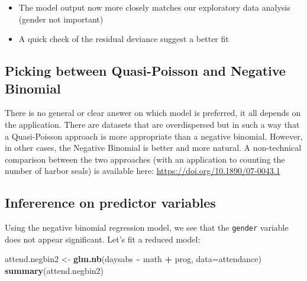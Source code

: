 \documentclass[
]{book}
\newenvironment{Shaded}{\begin{snugshade}}{\end{snugshade}}
\newcommand{\AttributeTok}[1]{\textcolor[rgb]{0.13,0.29,0.53}{#1}}
\newcommand{\FunctionTok}[1]{\textcolor[rgb]{0.13,0.29,0.53}{\textbf{#1}}}
\newcommand{\NormalTok}[1]{#1}
\newcommand{\OtherTok}[1]{\textcolor[rgb]{0.56,0.35,0.01}{#1}}
\newcommand{\SpecialCharTok}[1]{\textcolor[rgb]{0.81,0.36,0.00}{\textbf{#1}}}
\providecommand{\tightlist}{%
  \setlength{\itemsep}{0pt}\setlength{\parskip}{0pt}}
\begin{document}
\begin{itemize}
\tightlist
\item
  The model output now more closely matches our exploratory data analysis (gender not important)
\item
  A quick check of the residual deviance suggest a better fit
\end{itemize}

\hypertarget{picking-between-quasi-poisson-and-negative-binomial}{%
\subsection{Picking between Quasi-Poisson and Negative Binomial}\label{picking-between-quasi-poisson-and-negative-binomial}}

There is no general or clear answer on which model is preferred, it all depends on the application. There are datasets that are overdispersed but in such a way that a Quasi-Poisson approach is more appropriate than a negative binomial. However, in other cases, the Negative Binomial is better and more natural. A non-technical comparison between the two approaches (with an application to counting the number of harbor seals) is available here: \url{https://doi.org/10.1890/07-0043.1}

\hypertarget{infererence-on-predictor-variables}{%
\subsection{Infererence on predictor variables}\label{infererence-on-predictor-variables}}

Using the negative binomial regression model, we see that the \texttt{gender} variable does not appear significant. Let's fit a reduced model:

\begin{Shaded}
\begin{Highlighting}[]
\NormalTok{attend.negbin2 }\OtherTok{\textless{}{-}} \FunctionTok{glm.nb}\NormalTok{(daysabs }\SpecialCharTok{\textasciitilde{}}\NormalTok{ math }\SpecialCharTok{+}\NormalTok{ prog, }\AttributeTok{data=}\NormalTok{attendance)}
\FunctionTok{summary}\NormalTok{(attend.negbin2)}
\end{Highlighting}
\end{Shaded}
\end{document}
